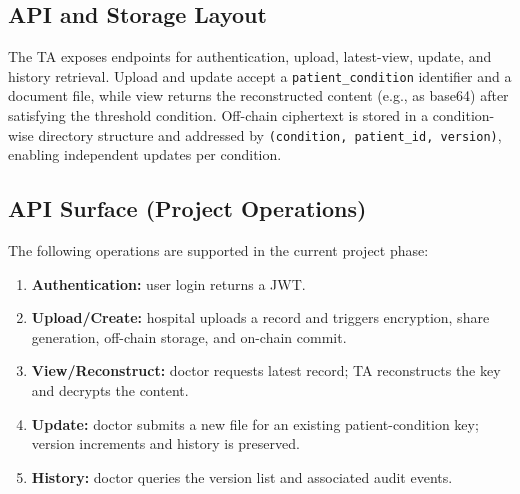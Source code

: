 \documentclass{IEEEtran}
\begin{document}
\subsection{API and Storage Layout}
The TA exposes endpoints for authentication, upload, latest-view, update, and history retrieval. Upload and update accept a \texttt{patient\_condition} identifier and a document file, while view returns the reconstructed content (e.g., as base64) after satisfying the threshold condition. Off-chain ciphertext is stored in a condition-wise directory structure and addressed by \texttt{(condition, patient\_id, version)}, enabling independent updates per condition.

\subsection{API Surface (Project Operations)}
The following operations are supported in the current project phase:
\begin{enumerate}
\item \textbf{Authentication:} user login returns a JWT.
\item \textbf{Upload/Create:} hospital uploads a record and triggers encryption, share generation, off-chain storage, and on-chain commit.
\item \textbf{View/Reconstruct:} doctor requests latest record; TA reconstructs the key and decrypts the content.
\item \textbf{Update:} doctor submits a new file for an existing patient-condition key; version increments and history is preserved.
\item \textbf{History:} doctor queries the version list and associated audit events.
\end{enumerate}
\end{document}
